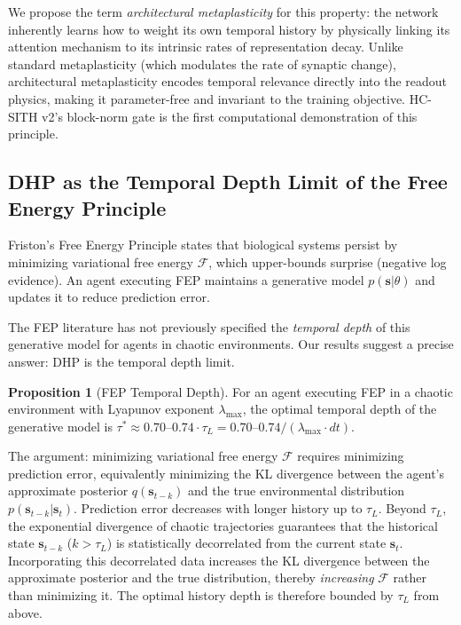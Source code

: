\documentclass[12pt]{article}
\theoremstyle{definition}
\newtheorem{proposition}{Proposition}
\begin{document}
We propose the term \emph{architectural metaplasticity} for this property: the network
inherently learns how to weight its own temporal history by physically linking its attention
mechanism to its intrinsic rates of representation decay. Unlike standard metaplasticity
(which modulates the rate of synaptic change), architectural metaplasticity encodes
temporal relevance directly into the readout physics, making it parameter-free and
invariant to the training objective. HC-SITH v2's block-norm gate is the first
computational demonstration of this principle.

\subsection{DHP as the Temporal Depth Limit of the Free Energy Principle}

Friston's Free Energy Principle \citep{friston2010free} states that biological systems
persist by minimizing variational free energy $\mathcal{F}$, which upper-bounds
surprise (negative log evidence). An agent executing FEP maintains a generative model
$p(\mathbf{s} | \theta)$ and updates it to reduce prediction error.

The FEP literature has not previously specified the \emph{temporal depth} of this
generative model for agents in chaotic environments. Our results suggest a precise
answer: DHP is the temporal depth limit.

\begin{proposition}[FEP Temporal Depth]
  For an agent executing FEP in a chaotic environment with Lyapunov exponent
  $\lambda_{\max}$, the optimal temporal depth of the generative model is
  $\tau^* \approx 0.70\text{--}0.74 \cdot \tau_L = 0.70\text{--}0.74 /
  (\lambda_{\max} \cdot dt)$.
\end{proposition}

The argument: minimizing variational free energy $\mathcal{F}$ requires minimizing
prediction error, equivalently minimizing the KL divergence between the agent's
approximate posterior $q(\mathbf{s}_{t-k})$ and the true environmental distribution
$p(\mathbf{s}_{t-k} | \mathbf{s}_t)$. Prediction error decreases with longer history
up to $\tau_L$. Beyond $\tau_L$, the exponential divergence of chaotic trajectories
guarantees that the historical state $\mathbf{s}_{t-k}$ ($k > \tau_L$) is
statistically decorrelated from the current state $\mathbf{s}_t$. Incorporating
this decorrelated data increases the KL divergence between the approximate posterior
and the true distribution, thereby \emph{increasing} $\mathcal{F}$ rather than
minimizing it. The optimal history depth is therefore bounded by $\tau_L$ from above.
\end{document}
